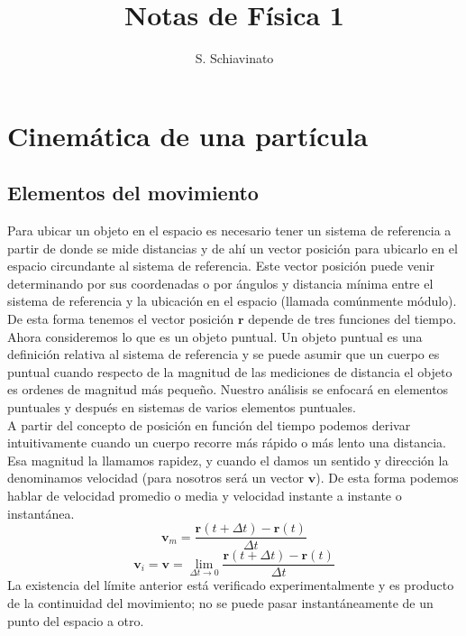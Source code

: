 \documentclass[a4paper]{article}
\title{Notas de Física 1}
\author{S. Schiavinato}
\date{}
\numberwithin{equation}{section}
\begin{document}
\maketitle
\section{Cinemática de una partícula}
    \subsection{Elementos del movimiento}
        Para ubicar un objeto en el espacio es necesario tener un sistema de referencia a partir de donde se mide distancias y de ahí un vector posición para ubicarlo en el espacio circundante al sistema de referencia. Este vector posición puede venir determinando por sus coordenadas o por ángulos y distancia mínima entre el sistema de referencia y la ubicación en el espacio (llamada comúnmente módulo). De esta forma tenemos el vector posición $\boldsymbol{r}$ depende de tres funciones del tiempo.\\
        Ahora consideremos lo que es un objeto puntual. Un objeto puntual es una definición relativa al sistema de referencia y se puede asumir que un cuerpo es puntual cuando respecto de la magnitud de las mediciones de distancia el objeto es ordenes de magnitud más pequeño. Nuestro análisis se enfocará en elementos puntuales y después en sistemas de varios elementos puntuales.\\
        A partir del concepto de posición en función del tiempo podemos derivar intuitivamente cuando un cuerpo recorre más rápido o más lento una distancia. Esa magnitud la llamamos rapidez, y cuando el damos un sentido y dirección la denominamos velocidad (para nosotros será un vector $\boldsymbol{v}$). De esta forma podemos hablar de velocidad promedio o media y velocidad instante a instante o instantánea. 
        \begin{equation}
            \boldsymbol{v}_{m} = \frac{\boldsymbol{r}(t + \Delta t) - \boldsymbol{r}(t)}{\Delta t}
        \end{equation}
        \begin{equation}
            \boldsymbol{v}_{i} = \boldsymbol{v} = \lim_{\Delta t \to 0} \frac{\boldsymbol{r}(t + \Delta t) - \boldsymbol{r}(t)}{\Delta t}
        \end{equation}
        La existencia del límite anterior está verificado experimentalmente y es producto de la continuidad del movimiento; no se puede pasar instantáneamente de un punto del espacio a otro.\\
\end{document}
